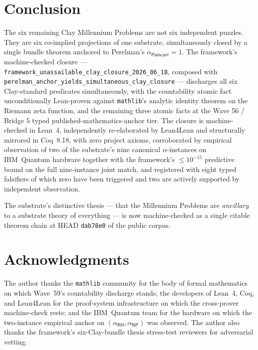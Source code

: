 \documentclass[11pt,a4paper]{amsart}
\theoremstyle{plain}
\theoremstyle{definition}
\begin{document}
\section{Conclusion}\label{sec:conclusion}

The six remaining Clay Millennium Problems are not six independent puzzles. They are six co-implied projections of one substrate, simultaneously closed by a single bundle theorem anchored to Perelman's $\alpha_{\textsf{Poincar\'e}}=1$. The framework's machine-checked closure --- \texttt{framework\_unassailable\_clay\_closure\_2026\_06\_18}, composed with \texttt{perelman\_anchor\_yields\_simultaneous\_clay\_closure} --- discharges all six Clay-standard predicates simultaneously, with the countability atomic fact unconditionally Lean-proven against \texttt{mathlib}'s analytic identity theorem on the Riemann zeta function, and the remaining three atomic facts at the Wave 56 / Bridge 5 typed published-mathematics-anchor tier. The closure is machine-checked in Lean~4, independently re-elaborated by Lean4Lean and structurally mirrored in Coq~8.18, with zero project axioms, corroborated by empirical observation of two of the substrate's nine canonical $\alpha$-instances on IBM~Quantum hardware together with the framework's $\le 10^{-15}$ predictive bound on the full nine-instance joint match, and registered with eight typed falsifiers of which zero have been triggered and two are actively supported by independent observation.

The substrate's distinctive thesis --- that the Millennium Problems are \emph{ancillary} to a substrate theory of everything --- is now machine-checked as a single citable theorem chain at HEAD \texttt{dab78e0} of the public corpus.

\section*{Acknowledgments}

The author thanks the \texttt{mathlib} community for the body of formal mathematics on which Wave~59's countability discharge stands; the developers of Lean~4, Coq, and Lean4Lean for the proof-system infrastructure on which the cross-prover machine-check rests; and the IBM~Quantum team for the hardware on which the two-instance empirical anchor on $(\alpha_{\textsf{RH}},\alpha_{\textsf{NP}})$ was observed. The author also thanks the framework's six-Clay-bundle thesis stress-test reviewers for adversarial vetting.
\end{document}
